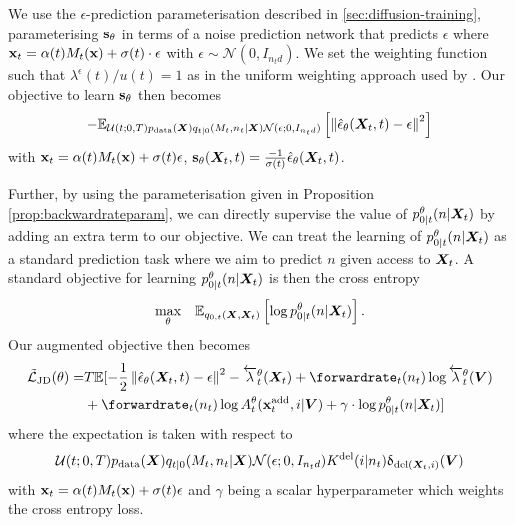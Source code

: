 We use the $\epsilon$-prediction parameterisation described in \cref{sec:diffusion-training}, parameterising ${\mathbf{s}}_\theta$ in terms of a noise prediction network that predicts $\epsilon$ where ${\mathbf{x}}_t = \alpha(t) M_t({\mathbf{x}}) + \sigma(t) \cdot \epsilon$ with $\epsilon \sim \mathcal{N}(0, I_{n_t d})$. We set the weighting function such that $\lambda^\epsilon(t)/u(t) = 1$ as in the uniform weighting approach used by \citet{song2020score}. Our objective to learn ${\mathbf{s}}_\theta$ then becomes
\begin{equation}
    - \mathbb{E}_{\mathcal{U}(t; 0, T) p_{\rm{data}}({\bm{X}}) q_{t|0}(M_t, n_t | {\bm{X}}) \mathcal{N}(\epsilon; 0, I_{n_t d})} \left[ \left\lVert\hat{\mathbf{\epsilon}}_\theta({\bm{X}}_t, t) - \epsilon\right\rVert^2 \right]
\end{equation}
with ${\mathbf{x}}_t = \alpha(t) M_t({\mathbf{x}}) + \sigma(t) \epsilon$, ${\mathbf{s}}_\theta({\bm{X}}_t, t) = \frac{-1}{\sigma(t)} \hat{\mathbf{\epsilon}}_\theta({\bm{X}}_t, t)$.

Further, by using the parameterisation given in Proposition \ref{prop:backwardrateparam}, we can directly supervise the value of $p_{0|t}^\theta(n | {\bm{X}}_t)$ by adding an extra term to our objective. We can treat the learning of $p_{0|t}^\theta(n | {\bm{X}}_t)$ as a standard prediction task where we aim to predict $n$ given access to ${\bm{X}}_t$. A standard objective for learning $p_{0|t}^\theta(n | {\bm{X}}_t)$ is then the cross entropy
\begin{equation}
    \underset{\theta}{\text{max}} \quad \mathbb{E}_{q_{0,t}({\bm{X}}, {\bm{X}}_t)} \left[ \log p_{0|t}^{\theta}(n | {\bm{X}}_t) \right] .
\end{equation}
Our augmented objective then becomes
\begin{align} \label{eq:augmentedObjective}
    \tilde{\mathcal{L}}_\text{JD}(\theta) = &T\mathbb{E} [ -\frac{1}{2}\norm{\hat{\mathbf{\epsilon}}_\theta(\mX_t, t) - \epsilon}^2 - \backwardrate_t^\theta(\mX_t) + \forwardrate_t(n_t) \log \backwardrate_t^\theta(\mV) \\ 
    &+ \forwardrate_t(n_t) \log \autonet_t^\theta(\xadd_t, i | \mV) + \gamma \cdot \log p_{0|t}^\theta (n | \mX_t) ] \nonumber
\end{align}
where the expectation is taken with respect to 
\begin{equation}
\mathcal{U}(t; 0, T) p_{\rm{data}}({\bm{X}}) q_{t|0}(M_t, n_t | {\bm{X}}) \mathcal{N}(\epsilon; 0, I_{n_t d}) K^{\textup{del}}(i | n_t) \updelta_{\text{del}({\bm{X}}_t, i)}({\bm{V}})
\end{equation}
with ${\mathbf{x}}_t = \alpha(t) M_t({\mathbf{x}}) + \sigma(t) \epsilon$ and $\gamma$ being a scalar hyperparameter which weights the cross entropy loss.



